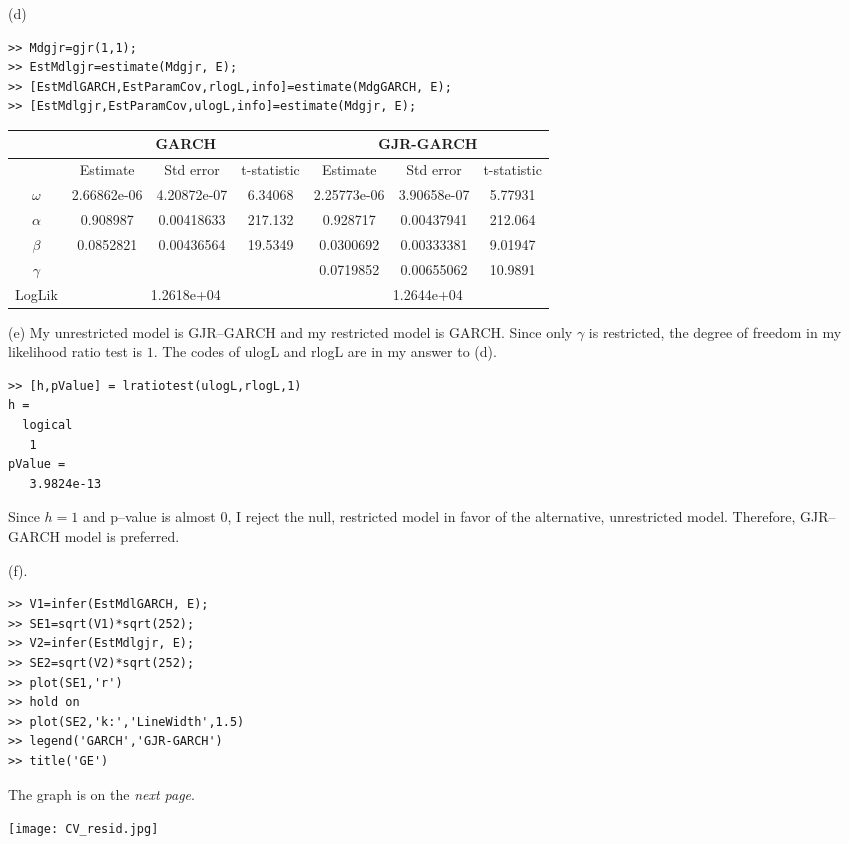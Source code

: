 \documentclass[11pt]{article}
\begin{document}
\bigskip
(d)
\begin{lstlisting}
>> Mdgjr=gjr(1,1);
>> EstMdlgjr=estimate(Mdgjr, E);
>> [EstMdlGARCH,EstParamCov,rlogL,info]=estimate(MdgGARCH, E);
>> [EstMdlgjr,EstParamCov,ulogL,info]=estimate(Mdgjr, E);
\end{lstlisting}
\begin{tabular}{ |c|c|c|c|c|c|c|  }
 \hline
  &\multicolumn{3}{c|}{GARCH} &\multicolumn{3}{c|}{GJR-GARCH} \\
  \hline
  & Estimate & Std error & t-statistic & Estimate & Std error & t-statistic \\ 
  \hline
 $\omega$ & 2.66862e-06 &  4.20872e-07 & 6.34068 &2.25773e-06   & 3.90658e-07 & 5.77931 \\ 
 $\alpha$ & 0.908987 & 0.00418633 & 217.132 & 0.928717 & 0.00437941 & 212.064\\ 
 $\beta$ & 0.0852821 & 0.00436564 & 19.5349 & 0.0300692 & 0.00333381 & 9.01947\\
 $\gamma$ &  & &  & 0.0719852 & 0.00655062 & 10.9891\\
  \hline
  LogLik &\multicolumn{3}{c|}{1.2618e+04 } & \multicolumn{3}{c|}{1.2644e+04 }\\
\hline
\end{tabular}

\bigskip
(e) My unrestricted model is GJR--GARCH and my restricted model is GARCH. Since only $\gamma$ is restricted, the degree of freedom in my likelihood ratio test is $1$. The codes of ulogL and rlogL are in my answer to (d).
\begin{lstlisting}
>> [h,pValue] = lratiotest(ulogL,rlogL,1)
h =
  logical
   1
pValue =
   3.9824e-13
\end{lstlisting}
Since $h=1$ and p--value is almost $0$, I reject the null, restricted model in favor of the alternative, unrestricted model. Therefore, GJR--GARCH model is preferred.

\bigskip
(f).\begin{lstlisting}
>> V1=infer(EstMdlGARCH, E);
>> SE1=sqrt(V1)*sqrt(252);
>> V2=infer(EstMdlgjr, E);
>> SE2=sqrt(V2)*sqrt(252);
>> plot(SE1,'r')
>> hold on
>> plot(SE2,'k:','LineWidth',1.5)
>> legend('GARCH','GJR-GARCH')
>> title('GE')
\end{lstlisting}

The graph is on the \textit{next page}.

\texttt{[image: CV\_resid.jpg]}
\end{document}
